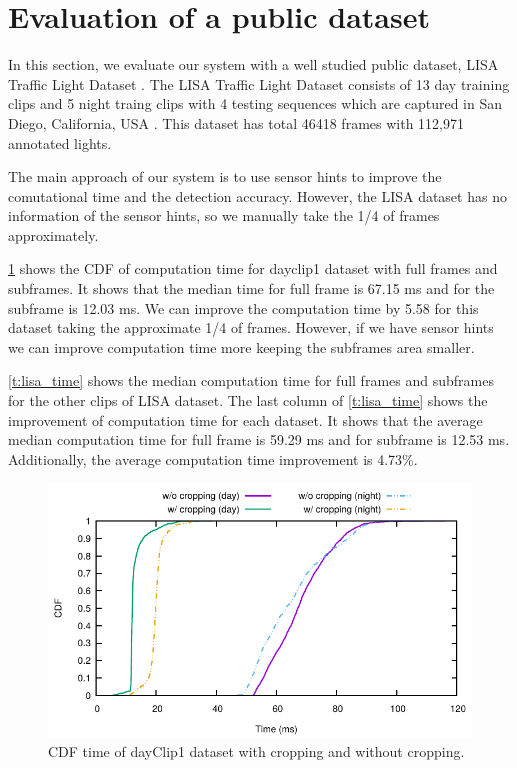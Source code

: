 \section{Evaluation of a public dataset}

In this section, we evaluate our system with a well studied public dataset, LISA Traffic Light Dataset \cite{lisa}.
The LISA Traffic Light Dataset consists of 13 day training clips and 5 night traing clips with 4 testing sequences which are captured in San Diego, California, USA \cite{lisa2}.
This dataset has total 46418 frames with 112,971 annotated lights.

The main approach of our system is to use sensor hints to improve the comutational time and the detection accuracy.
However, the LISA dataset has no information of the sensor hints, so we manually take the 1/4 of frames approximately.

\ref{f:lisa_cdf} shows the CDF of computation time for dayclip1 dataset with full frames and subframes.
It shows that the median time for full frame is 67.15 ms and for the subframe is 12.03 ms.
We can improve the computation time by 5.58 for this dataset taking the approximate 1/4 of frames.
However, if we have sensor hints we can improve computation time more keeping the subframes area smaller.

\ref{t:lisa_time} shows the median computation time for full frames and subframes for the other clips of LISA dataset.
The last column of \ref{t:lisa_time} shows the improvement of computation time for each dataset.
It shows that the average median computation time for full frame is 59.29 ms and for subframe is 12.53 ms.
Additionally, the average computation time improvement is 4.73\%. 


\begin{figure}[ht!]
  \centering
  \includegraphics[width=5.2in]{plots/lisacdf.pdf}
  \caption{CDF time of dayClip1 dataset with cropping and without cropping.}
  \label{f:lisa_cdf}
\end{figure}

